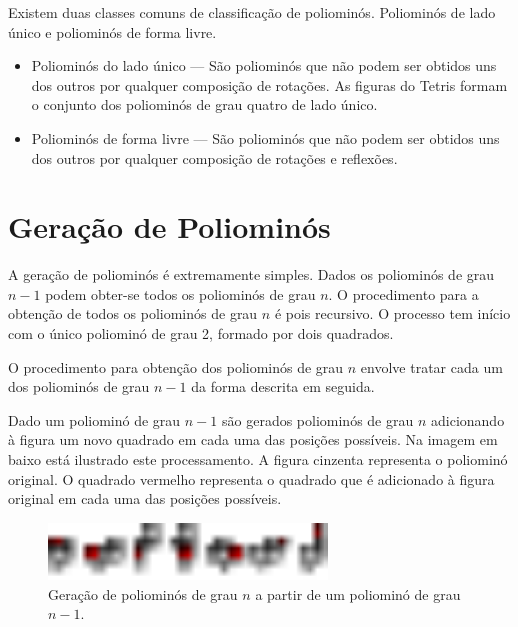 \documentclass[11pt]{article}
\begin{document}
Existem duas classes comuns de classificação de poliominós. Poliominós
de lado único e poliominós de forma livre.

\begin{itemize}

\item Poliominós do lado único --- São poliominós que não podem ser
  obtidos uns dos outros por qualquer composição de rotações. As
  figuras do Tetris formam o conjunto dos poliominós de grau quatro de
  lado único.

\item Poliominós de forma livre --- São poliominós que não podem ser
  obtidos uns dos outros por qualquer composição de rotações e
  reflexões.

\end{itemize}





\section{Geração de Poliominós}

A geração de poliominós é extremamente simples. Dados os poliominós de
grau $n-1$ podem obter-se todos os poliominós de grau $n$. O procedimento
para a obtenção de todos os poliominós de grau $n$ é pois recursivo. O
processo tem início com o único poliominó de grau 2, formado por dois
quadrados.

O procedimento para obtenção dos poliominós de grau $n$ envolve tratar
cada um dos poliominós de grau $n-1$ da forma descrita em seguida.

Dado um poliominó de grau $n-1$ são gerados poliominós de grau $n$
adicionando à figura um novo quadrado em cada uma das posições
possíveis. Na imagem em baixo está ilustrado este processamento. A
figura cinzenta representa o poliominó original. O quadrado vermelho
representa o quadrado que é adicionado à figura original em cada uma
das posições possíveis.

\begin{figure}[H]
  \centering
  \includegraphics[width=0.66\textwidth]{../images/poliominos-step.pdf}
  \caption{Geração de poliominós de grau $n$ a partir de um poliominó
    de grau $n-1$.}
\end{figure}
\end{document}
